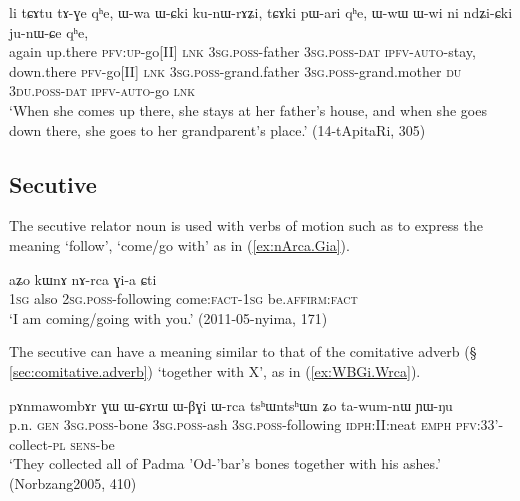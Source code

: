 \begin{exe}
\ex \label{ex:WCki.kunWrAZi}
\gll  li tɕɤtu tɤ-ɣe qʰe, ɯ-wa ɯ-ɕki ku-nɯ-rɤʑi, tɕɤki pɯ-ari qʰe, ɯ-wɯ ɯ-wi ni ndʑi-ɕki ju-nɯ-ɕe qʰe, \\
again up.there \textsc{pfv}:\textsc{up}-go[II] \textsc{lnk} \textsc{3sg}.\textsc{poss}-father \textsc{3sg}.\textsc{poss}-\textsc{dat} \textsc{ipfv}-\textsc{auto}-stay, down.there \textsc{pfv}-go[II] \textsc{lnk} \textsc{3sg}.\textsc{poss}-grand.father \textsc{3sg}.\textsc{poss}-grand.mother \textsc{du} \textsc{3du}.\textsc{poss}-\textsc{dat} \textsc{ipfv}-\textsc{auto}-go \textsc{lnk}  \\
\glt `When she comes up there, she stays at her father's house, and when she goes down there, she goes to her grandparent's place.' (14-tApitaRi, 305)
\end{exe}

\subsection{Secutive} \label{sec:secutive} 
The secutive relator noun  is used with verbs of motion such as  to express the meaning `follow', `come/go with' as in (\ref{ex:nArca.Gia}).

\begin{exe}
\ex \label{ex:nArca.Gia}
 \gll  aʑo kɯnɤ nɤ-rca ɣi-a ɕti \\
 \textsc{1sg} also \textsc{2sg}.\textsc{poss}-following come:\textsc{fact}-\textsc{1sg} be.\textsc{affirm}:\textsc{fact} \\
\glt `I am coming/going with you.' (2011-05-nyima, 171)
\end{exe}

The secutive can have a meaning similar to that of the comitative adverb (§ \ref{sec:comitative.adverb}) `together with X', as in (\ref{ex:WBGi.Wrca}).

\begin{exe}
\ex \label{ex:WBGi.Wrca}
 \gll  pɤnmawombɤr ɣɯ ɯ-ɕɤrɯ ɯ-βɣi ɯ-rca tsʰɯntsʰɯn ʑo ta-wum-nɯ ɲɯ-ŋu \\ 
p.n. \textsc{gen} \textsc{3sg}.\textsc{poss}-bone \textsc{3sg}.\textsc{poss}-ash \textsc{3sg}.\textsc{poss}-following \textsc{idph}:II:neat \textsc{emph} \textsc{pfv}:3\fl{}3'-collect-\textsc{pl} \textsc{sens}-be  \\
\glt `They collected all of Padma 'Od-'bar's bones together with his ashes.' (Norbzang2005, 410)
\end{exe}

